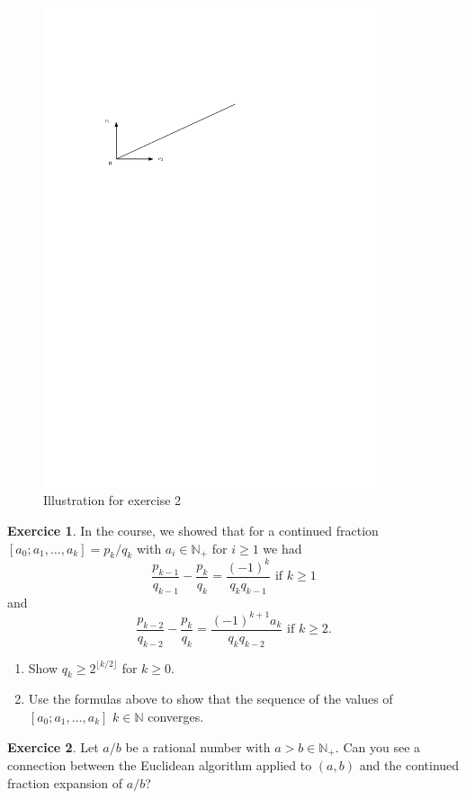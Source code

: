 \documentclass[12pt,a4paper]{article}
\theoremstyle{plain}
\newtheorem*{Sol*}{Solution}
\theoremstyle{definition}
\newtheorem{Ex}{Exercice}
\newif\ifsolutions
\newcommand{\exercise}[2]{
			\begin{Ex} #1 \end{Ex}
			\ifsolutions  \begin{Sol*} #2 \end{Sol*} \bigskip \else \bigskip  \fi
		}
\begin{document}
  \begin{figure}[h]
    \begin{center}
    \includegraphics[width=10cm]{Figure2.pdf}
    \caption{Illustration for exercise 2}
          
    \end{center}

  \end{figure}


  \exercise{
    In the course, we showed that for a continued fraction $[a_0;a_1,\dots,a_k] = p_k / q_k$ with $a_i∈ ℕ_+$  for $i≥ 1$  we had
    \begin{displaymath}
      \frac{p_{k-1}}{q_{k-1}} - \frac{p_k}{q_k} = \frac{(-1)^k}{q_k q_{k-1}} \text{ if } k≥1
    \end{displaymath}
    and
    \begin{displaymath}
      \frac{p_{k-2}}{q_{k-2}} - \frac{p_k}{q_k} = \frac{(-1)^{k+1} a_k}{q_k q_{k-2}} \text{ if } k≥2. 
    \end{displaymath}

    \begin{enumerate}
    \item Show  $q_k ≥ 2^{⌊k/2⌋}$ for $k≥ 0$.
      \item Use the formulas above to show that the sequence of the values of $[a_0;a_1,\dots,a_k]$ $k ∈ ℕ$ converges. 
    \end{enumerate}    
  }{}


  \exercise{
    Let $a/b$ be a rational number with $a>b ∈ ℕ_+$. Can you see a connection between the Euclidean algorithm applied to $(a,b)$ and the continued fraction expansion of $a/b$? 
  }{}
  
\end{document}
